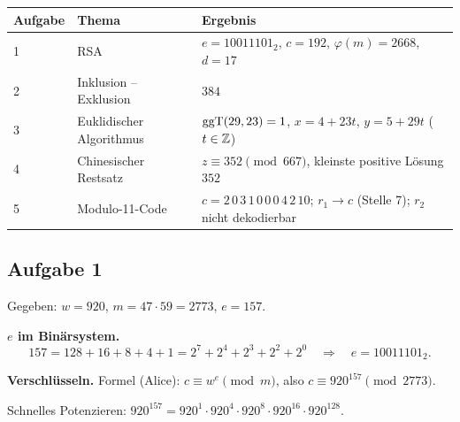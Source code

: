\begin{center}
\begin{tabular}{@{}llp{}@{}}
\toprule
Aufgabe & Thema & Ergebnis\\
\midrule
1 & RSA & $e = 10011101_2$, $c = 192$, $\varphi(m) = 2668$, $d = 17$\\
2 & Inklusion -- Exklusion & $384$\\
3 & Euklidischer Algorithmus & $\operatorname{ggT}(29,23) = 1$, $x = 4 + 23t$, $y = 5 + 29t$ ($t \in \mathbb{Z}$)\\
4 & Chinesischer Restsatz & $z \equiv 352 \pmod{667}$, kleinste positive Lösung $352$\\
5 & Modulo-11-Code & $c = 2\,0\,3\,1\,0\,0\,0\,4\,2\,10$; $r_1 \to c$ (Stelle 7); $r_2$ nicht dekodierbar\\
\bottomrule
\end{tabular}
\end{center}

\subsection*{Aufgabe 1}
Gegeben: $w = 920$, $m = 47 \cdot 59 = 2773$, $e = 157$.

 \textbf{$e$ im Binärsystem.}
\[
157 = 128 + 16 + 8 + 4 + 1 = 2^7 + 2^4 + 2^3 + 2^2 + 2^0
\quad\Rightarrow\quad e = 10011101_2 .
\]

 \textbf{Verschlüsseln.} Formel (Alice): $c \equiv w^e \pmod m$, also $c \equiv 920^{157} \pmod{2773}$.

Schnelles Potenzieren: $920^{157} = 920^{1} \cdot 920^{4} \cdot 920^{8} \cdot 920^{16} \cdot 920^{128}$.

